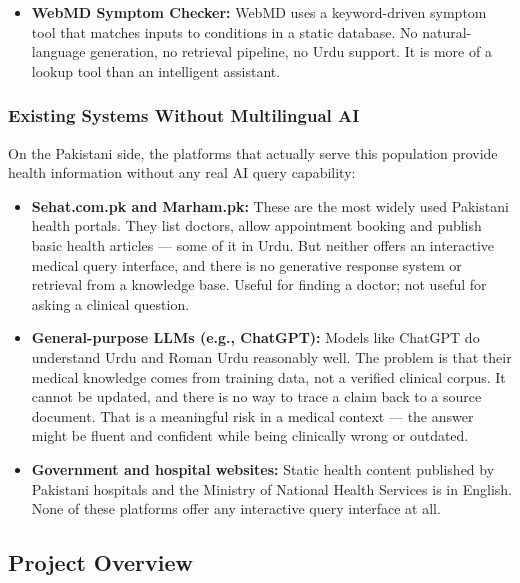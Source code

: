 \begin{itemize}
  \item \textbf{WebMD Symptom Checker:} WebMD uses a keyword-driven symptom tool that
        matches inputs to conditions in a static database. No natural-language generation,
        no retrieval pipeline, no Urdu support. It is more of a lookup tool than an
        intelligent assistant.

\end{itemize}

\subsubsection{Existing Systems Without Multilingual AI}

On the Pakistani side, the platforms that actually serve this population provide health
information without any real AI query capability:

\begin{itemize}

  \item \textbf{Sehat.com.pk and Marham.pk:} These are the most widely used Pakistani
        health portals. They list doctors, allow appointment booking and publish basic
        health articles --- some of it in Urdu. But neither offers an interactive medical
        query interface, and there is no generative response system or retrieval from a
        knowledge base. Useful for finding a doctor; not useful for asking a clinical
        question.

  \item \textbf{General-purpose LLMs (e.g., ChatGPT):} Models like ChatGPT do understand
        Urdu and Roman Urdu reasonably well. The problem is that their medical knowledge
        comes from training data, not a verified clinical corpus. It cannot be updated, and
        there is no way to trace a claim back to a source document. That is a meaningful
        risk in a medical context --- the answer might be fluent and confident while being
        clinically wrong or outdated.

  \item \textbf{Government and hospital websites:} Static health content published by
        Pakistani hospitals and the Ministry of National Health Services is in English.
        None of these platforms offer any interactive query interface at all.

\end{itemize}

\subsection{Project Overview}

